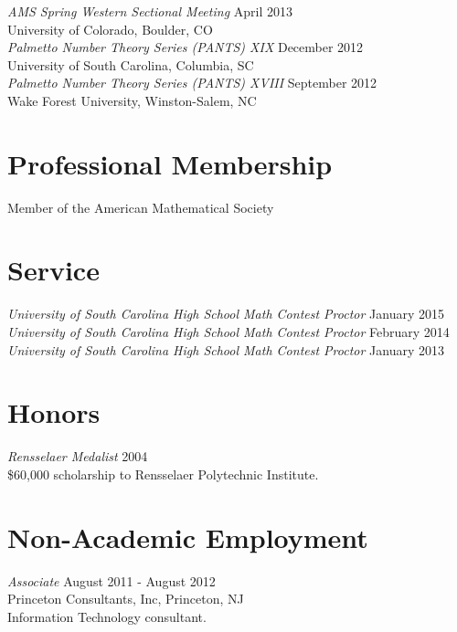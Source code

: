\documentclass{article}
\begin{document}
\noindent\textsl{AMS Spring Western Sectional Meeting} \hfill April 2013\\
University of Colorado, Boulder, CO\\

\noindent\textsl{Palmetto Number Theory Series (PANTS) XIX} \hfill December 2012\\
University of South Carolina, Columbia, SC\\

\noindent\textsl{Palmetto Number Theory Series (PANTS) XVIII} \hfill September 2012\\
Wake Forest University, Winston-Salem, NC



\section*{Professional Membership}
Member of the American Mathematical Society

\section*{Service}
\textsl{University of South Carolina High School Math Contest Proctor} \hfill January 2015\\
\textsl{University of South Carolina High School Math Contest Proctor} \hfill February 2014\\
\textsl{University of South Carolina High School Math Contest Proctor} \hfill January 2013

\section*{Honors}
\textsl{Rensselaer Medalist} \hfill 2004\\
\$60,000 scholarship to Rensselaer Polytechnic Institute.

\section*{Non-Academic Employment}             
\textsl{Associate} \hfill August 2011 - August 2012\\
Princeton Consultants, Inc, Princeton, NJ\\
Information Technology consultant.\\
\end{document}
